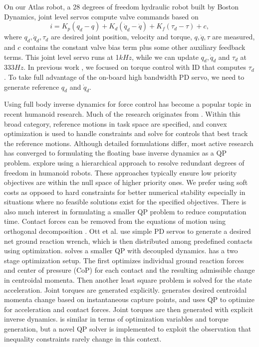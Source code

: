 \documentclass{ws-ijhr}
\begin{document}
On our Atlas robot, a 28 degrees of freedom hydraulic robot built by Boston 
Dynamics, joint level servos compute valve commands based on 
\begin{equation}
  i = K_p(q_d-q) + K_d(\dot{q}_d-\dot{q}) + K_f(\tau_d-\tau) + c,
  \label{eq:servo}
\end{equation}
where $q_d, \dot{q}_d, \tau_d$ are desired joint position, velocity and torque,
$q, \dot{q}, \tau$ are measured, and 
$c$ contains the constant valve bias term plus some other auxiliary feedback 
terms. This joint level servo runs at 1$kHz$, while we can update 
$q_d,\dot{q}_d$ and $\tau_d$ at 333$Hz$. 
In previous work \cite{stephens_thesis,whitman_thesis,sfeng_online}, we focused on torque control with ID that 
computes $\tau_d$. To take full advantage of the on-board high bandwidth PD 
servo, we need to generate reference $q_d$ and $\dot{q}_d$. 

Using full body inverse dynamics for force control has become a popular topic
in recent humanoid research. Much of the research originates from \cite{khatib_op_space_ctrl}. 
Within this broad category, reference motions in task space are specified, 
and convex optimization is used to handle constraints and solve for controls
that best track the reference motions. 
Although detailed formulations differ, most active research has converged to 
formulating the floating base inverse dynamics as a QP problem. 
\cite{eth_id,Hutter01052014,alex_hir,saab_fast_hir_qp,deLasa_hir,wensing_hir,sentis_wbc} 
explore using a hierarchical approach to 
resolve redundant degrees of freedom in humanoid robots. These approaches
typically ensure low priority objectives are within the null space of higher
priority ones. 
We prefer using soft costs as opposed to hard constraints for better numerical 
stability especially in situations where no feasible solutions exist for the 
specified objectives.
There is also much interest in formulating a smaller QP problem to reduce 
computation time. Contact forces can be removed from the
equations of motion using orthogonal decomposition \cite{usc_id1}.
Ott et al. \cite{ott_force_alloc} use simple PD servos to generate a 
desired net ground reaction wrench, which is then distributed among predefined 
contacts using optimization.
\cite{ramos_dyn_walking} solves a smaller QP with decoupled dynamics. 
\cite{lee_separate_grf} has a two stage optimization setup. The first optimizes
individual ground reaction forces and center of pressure (CoP) for each contact
and the resulting admissible change in centroidal momenta. Then another least 
square problem is solved for the state acceleration. Joint torques are 
generated explicitly. \cite{ihmc_vrc} generates desired centroidal
momenta change based on instantaneous capture points, and uses QP to optimize 
for acceleration and contact forces. Joint torques are then generated with 
explicit inverse dynamics. 
\cite{scott_qp} is similar in terms of optimization variables and torque 
generation, but a novel QP solver is implemented to exploit the observation that 
inequality constraints rarely change in this context.
\end{document}
